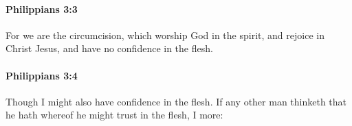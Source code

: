 		\paragraph{Philippians 3:3} %
			\label{PHILIPPIANS-3-3}

			For we are the circumcision, which worship God in the spirit, and rejoice in Christ Jesus, and have no confidence in the flesh.

			\begin{framed}
			\scriptsize
				\begin{compactdesc}
					\item[SBLG] 
				\end{compactdesc}
			\end{framed}

		\paragraph{Philippians 3:4} %
			\label{PHILIPPIANS-3-4}

			Though I might also have confidence in the flesh.  If any other man thinketh that he hath whereof he might trust in the flesh, I more:

